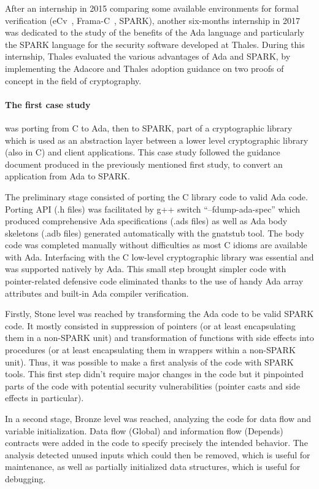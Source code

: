 \documentclass{llncs}
\begin{document}
After an internship in 2015 comparing some available environments for formal
verification (eCv~\cite{Crocker2014CMS}, Frama-C~\cite{Kirchner2015}, SPARK),
another six-months internship in 2017 was dedicated to the study of the
benefits of the Ada language and particularly the SPARK language for the
security software developed at Thales. During this internship, Thales evaluated the various advantages of Ada and
SPARK, by implementing the Adacore and Thales adoption guidance on two proofs
of concept in the field of cryptography.

\paragraph{The first case study} was porting from C to Ada, then to SPARK, part of a
cryptographic library which is used as an abstraction layer between a lower
level cryptographic library (also in C) and client applications. This case study
followed the guidance document produced in the previously mentioned first
study, to convert an application from Ada to SPARK.

The preliminary stage consisted of porting the C library code to valid Ada
code. Porting API (.h files) was facilitated by g++ switch ``–fdump-ada-spec''
which produced comprehensive Ada specifications (.ads files) as well as Ada
body skeletons (.adb files) generated automatically with the gnatstub tool. The
body code was completed manually without difficulties as most C idioms are
available with Ada. Interfacing with the C low-level cryptographic library was
essential and was supported natively by Ada. This small step brought
simpler code with pointer-related defensive code eliminated thanks to the use
of handy Ada array attributes and built-in Ada compiler verification.

Firstly, Stone level was reached by transforming the Ada code to be valid SPARK
code. It mostly consisted in suppression of pointers (or at least encapsulating
them in a non-SPARK unit) and transformation of functions with side effects
into procedures (or at least encapsulating them in wrappers within a non-SPARK
unit). Thus, it was possible to make a first analysis of the code with SPARK
tools. This first step didn't require major changes in the code but it
pinpointed parts of the code with potential security vulnerabilities
(pointer casts and side effects in particular).

In a second stage, Bronze level was reached, analyzing the code for data flow
and variable initialization. Data flow (Global) and information flow (Depends)
contracts were added in the code to specify precisely the intended
behavior. The analysis detected unused inputs which could then be removed,
which is useful for maintenance, as well as partially initialized data
structures, which is useful for debugging.
\end{document}
